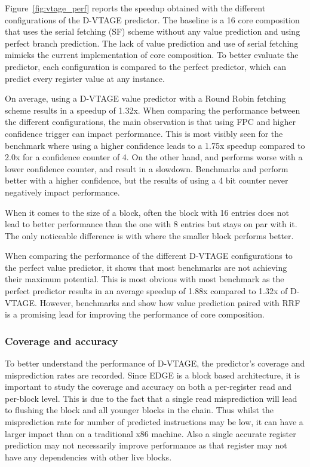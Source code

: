 Figure~\ref{fig:vtage_perf} reports the speedup obtained with the different configurations of the D-VTAGE predictor.
The baseline is a 16 core composition that uses the serial fetching (SF) scheme without any value prediction and using perfect branch prediction.
The lack of value prediction and use of serial fetching mimicks the current implementation of core composition.
To better evaluate the predictor, each configuration is compared to the perfect predictor, which can predict every register value at any instance.

On average, using a D-VTAGE value predictor with a Round Robin fetching scheme results in a speedup of 1.32x.
When comparing the performance between the different configurations, the main observation is that using FPC and higher confidence trigger can impact performance.
This is most visibly seen for the benchmark  where using a higher confidence leads to a 1.75x speedup compared to 2.0x for a confidence counter of 4.
On the other hand,  and  performs worse with a lower confidence counter, and result in a slowdown.
Benchmarks  and  perform better with a higher confidence, but the results of using a 4 bit counter never negatively impact performance.

When it comes to the size of a block, often the block with 16 entries does not lead to better performance than the one with 8 entries but stays on par with it.
The only noticeable difference is with  where the smaller block performs better.

When comparing the performance of the different D-VTAGE configurations to the perfect value predictor, it shows that most benchmarks are not achieving their maximum potential.
This is most obvious with most benchmark as the perfect predictor results in an average speedup of 1.88x compared to 1.32x of D-VTAGE.
However, benchmarks  and  show how value prediction paired with RRF is a promising lead for improving the performance of core composition.

\subsubsection{Coverage and accuracy}
To better understand the performance of D-VTAGE, the predictor's coverage and misprediction rates are recorded.
Since EDGE is a block based architecture, it is important to study the coverage and accuracy on both a per-register read and per-block level.
This is due to the fact that a single read misprediction will lead to flushing the block and all younger blocks in the chain.
Thus whilst the misprediction rate for number of predicted instructions may be low, it can have a larger impact than on a traditional x86 machine.
Also a single accurate register prediction may not necessarily improve performance as that register may not have any dependencies with other live blocks.

